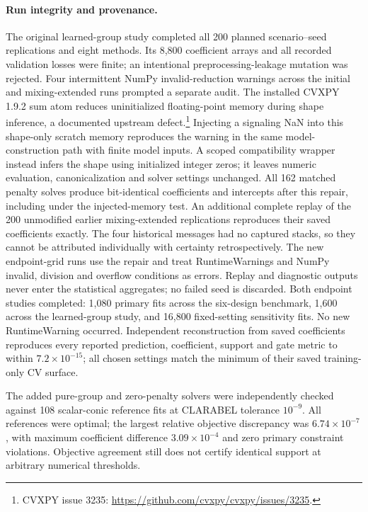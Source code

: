 \documentclass[11pt,a4paper]{article}
\begin{document}

\paragraph{Run integrity and provenance.}
The original learned-group study completed all 200 planned scenario--seed
replications and eight methods. Its 8,800 coefficient arrays and all recorded
validation losses were finite; an intentional preprocessing-leakage mutation
was rejected. Four intermittent NumPy invalid-reduction warnings across the
initial and mixing-extended runs prompted a separate audit. The installed
CVXPY 1.9.2 sum atom reduces uninitialized floating-point memory during shape
inference, a documented upstream defect.\footnote{CVXPY issue 3235:
\url{https://github.com/cvxpy/cvxpy/issues/3235}.}
Injecting a signaling NaN into this shape-only scratch memory reproduces the
warning in the same model-construction path with finite model inputs. A scoped
compatibility wrapper instead infers the shape using initialized integer zeros;
it leaves numeric evaluation, canonicalization and solver settings unchanged.
All 162 matched penalty solves produce bit-identical coefficients and intercepts
after this repair, including under the injected-memory test. An additional
complete replay of the 200 unmodified earlier mixing-extended replications reproduces their saved
coefficients exactly. The four historical messages had no captured stacks, so
they cannot be attributed individually with certainty retrospectively.
The new endpoint-grid runs use the repair and treat RuntimeWarnings and NumPy
invalid, division and overflow conditions as errors. Replay and diagnostic
outputs never enter the statistical aggregates; no failed seed is discarded.
Both endpoint studies completed: 1,080 primary fits across the six-design
benchmark, 1,600 across the learned-group study, and 16,800 fixed-setting
sensitivity fits. No new RuntimeWarning occurred. Independent reconstruction
from saved coefficients reproduces every reported prediction, coefficient,
support and gate metric to within $7.2\times10^{-15}$; all chosen settings
match the minimum of their saved training-only CV surface.

The added pure-group and zero-penalty solvers were independently checked against
108 scalar-conic reference fits at CLARABEL tolerance $10^{-9}$. All references
were optimal; the largest relative objective discrepancy was
$6.74\times10^{-7}$, with maximum coefficient difference $3.09\times10^{-4}$
and zero primary constraint violations. Objective agreement still does not
certify identical support at arbitrary numerical thresholds.
\end{document}
